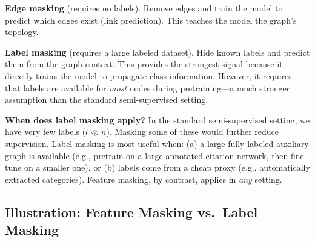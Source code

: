 \begin{notechapter}
\textbf{Edge masking} (requires no labels). Remove edges and train the model
to predict which edges exist (link prediction). This teaches the model the
graph's topology.

\textbf{Label masking} (requires a large labeled dataset). Hide known labels
and predict them from the graph context. This provides the strongest signal
because it directly trains the model to propagate class information. However,
it requires that labels are available for \emph{most} nodes during
pretraining---a much stronger assumption than the standard semi-supervised
setting.

\begin{warningbox}
\textbf{When does label masking apply?} In the standard semi-supervised
setting, we have very few labels ($l \ll n$). Masking some of these
would further reduce supervision. Label masking is most useful when:
(a) a large fully-labeled auxiliary graph is available (e.g., pretrain on a
large annotated citation network, then fine-tune on a smaller one), or
(b) labels come from a cheap proxy (e.g., automatically extracted
categories). Feature masking, by contrast, applies in \emph{any} setting.
\end{warningbox}

\subsection{Illustration: Feature Masking vs.\ Label Masking}

\begin{figure}[ht]
\centering
{}
\end{figure}
\end{notechapter}
